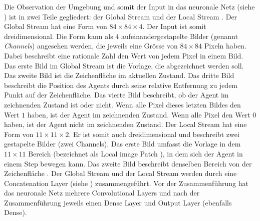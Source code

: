Die Observation der Umgebung und somit der Input in das neuronale Netz (siehe
) ist in zwei Teile gegliedert: der Global Stream und
der Local Stream \cite[S. 4]{zhou_learning_2018}. Der Global Stream hat eine
Form von $84\times84\times4$. Der Input ist somit dreidimensional. Die Form kann
als $4$ aufeinandergestapelte Bilder (genannt \emph{Channels}) angesehen werden, die jeweils eine Grösse
von $84\times84$ Pixeln haben. Dabei beschreibt eine rationale Zahl den Wert von
jedem Pixel in einem Bild. Das erste Bild im Global Stream ist die Vorlage, die
abgezeichnet werden soll. Das zweite Bild ist die Zeichenfläche im aktuellen
Zustand. Das dritte Bild beschreibt die Position des Agents durch seine relative
Entfernung zu jedem Punkt auf der Zeichenfläche. Das vierte Bild beschreibt, ob
der Agent im zeichnenden Zustand ist oder nicht. Wenn alle Pixel dieses letzten
Bildes den Wert $1$ haben, ist der Agent im zeichnenden Zustand. Wenn alle Pixel
den Wert $0$ haben, ist der Agent nicht im zeichnenden Zustand. Der Local Stream
hat eine Form von $11\times11\times2$. Er ist somit auch dreidimensional und
beschreibt zwei gestapelte Bilder (zwei Channels). Das erste Bild umfasst die Vorlage in dem
$11\times11$ Bereich (bezeichnet als Local image Patch \cite[S.
5]{zhou_learning_2018}), in dem sich der Agent in einem Step bewegen kann. Das
zweite Bild beschreibt denselben Bereich von der Zeichenfläche \cite[S. 4
ff.]{zhou_learning_2018}. Der Global Stream und der Local Stream werden durch
eine Concatenation Layer (siehe ) zusammengeführt.
Vor der Zusammenführung hat das neuronale Netz mehrere Convolutional Layers und
nach der Zusammenführung jeweils einen Dense Layer und Output Layer (ebenfalls Dense).
